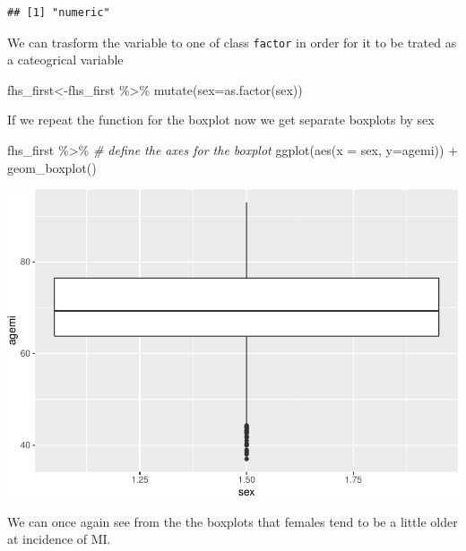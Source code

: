 \documentclass[
]{book}
\newenvironment{Shaded}{\begin{snugshade}}{\end{snugshade}}
\newcommand{\AttributeTok}[1]{\textcolor[rgb]{0.77,0.63,0.00}{#1}}
\newcommand{\CommentTok}[1]{\textcolor[rgb]{0.56,0.35,0.01}{\textit{#1}}}
\newcommand{\FunctionTok}[1]{\textcolor[rgb]{0.00,0.00,0.00}{#1}}
\newcommand{\NormalTok}[1]{#1}
\newcommand{\OtherTok}[1]{\textcolor[rgb]{0.56,0.35,0.01}{#1}}
\newcommand{\SpecialCharTok}[1]{\textcolor[rgb]{0.00,0.00,0.00}{#1}}
\begin{document}
\begin{verbatim}
## [1] "numeric"
\end{verbatim}

We can trasform the variable to one of class \texttt{factor} in order for it to be trated as a cateogrical variable

\begin{Shaded}
\begin{Highlighting}[]
\NormalTok{fhs\_first}\OtherTok{\textless{}{-}}\NormalTok{fhs\_first }\SpecialCharTok{\%\textgreater{}\%} 
\FunctionTok{mutate}\NormalTok{(}\AttributeTok{sex=}\FunctionTok{as.factor}\NormalTok{(sex))}
\end{Highlighting}
\end{Shaded}

If we repeat the function for the boxplot now we get separate boxplots by sex

\begin{Shaded}
\begin{Highlighting}[]
\NormalTok{fhs\_first }\SpecialCharTok{\%\textgreater{}\%} 
  \CommentTok{\# define the axes for the boxplot}
  \FunctionTok{ggplot}\NormalTok{(}\FunctionTok{aes}\NormalTok{(}\AttributeTok{x =}\NormalTok{ sex, }\AttributeTok{y=}\NormalTok{agemi)) }\SpecialCharTok{+} 
  \FunctionTok{geom\_boxplot}\NormalTok{()}
\end{Highlighting}
\end{Shaded}

\includegraphics{adv_epi_analysis_files/figure-latex/unnamed-chunk-93-1.pdf}

We can once again see from the the boxplots that females tend to be a little older at incidence of MI.
\end{document}
